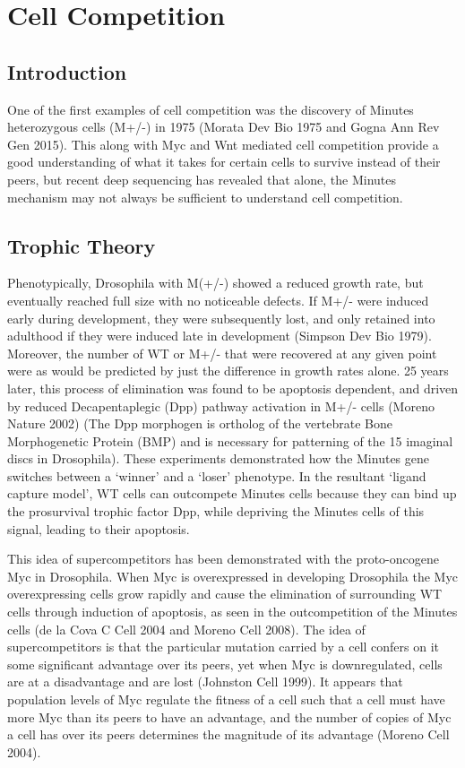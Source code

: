 \documentclass[]{book}
\begin{document}
\chapter{Cell Competition}\label{competition}

\section{Introduction}\label{introduction-3}

One of the first examples of cell competition was the discovery of
Minutes heterozygous cells (M+/-) in 1975 (Morata Dev Bio 1975 and Gogna
Ann Rev Gen 2015). This along with Myc and Wnt mediated cell competition
provide a good understanding of what it takes for certain cells to
survive instead of their peers, but recent deep sequencing has revealed
that alone, the Minutes mechanism may not always be sufficient to
understand cell competition.

\section{Trophic Theory}\label{trophic-theory}

Phenotypically, Drosophila with M(+/-) showed a reduced growth rate, but
eventually reached full size with no noticeable defects. If M+/- were
induced early during development, they were subsequently lost, and only
retained into adulthood if they were induced late in development
(Simpson Dev Bio 1979). Moreover, the number of WT or M+/- that were
recovered at any given point were as would be predicted by just the
difference in growth rates alone. 25 years later, this process of
elimination was found to be apoptosis dependent, and driven by reduced
Decapentaplegic (Dpp) pathway activation in M+/- cells (Moreno Nature
2002) (The Dpp morphogen is ortholog of the vertebrate Bone
Morphogenetic Protein (BMP) and is necessary for patterning of the 15
imaginal discs in Drosophila). These experiments demonstrated how the
Minutes gene switches between a `winner' and a `loser' phenotype. In the
resultant `ligand capture model', WT cells can outcompete Minutes cells
because they can bind up the prosurvival trophic factor Dpp, while
depriving the Minutes cells of this signal, leading to their apoptosis.

This idea of supercompetitors has been demonstrated with the
proto-oncogene Myc in Drosophila. When Myc is overexpressed in
developing Drosophila the Myc overexpressing cells grow rapidly and
cause the elimination of surrounding WT cells through induction of
apoptosis, as seen in the outcompetition of the Minutes cells (de la
Cova C Cell 2004 and Moreno Cell 2008). The idea of supercompetitors is
that the particular mutation carried by a cell confers on it some
significant advantage over its peers, yet when Myc is downregulated,
cells are at a disadvantage and are lost (Johnston Cell 1999). It
appears that population levels of Myc regulate the fitness of a cell
such that a cell must have more Myc than its peers to have an advantage,
and the number of copies of Myc a cell has over its peers determines the
magnitude of its advantage (Moreno Cell 2004).
\end{document}
